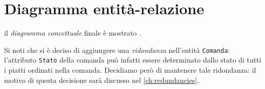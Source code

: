 \section{Diagramma entità-relazione}
il {\it diagramma concettuale} finale è mostrato .

Si noti che si è deciso di aggiungere una {\it ridondanza} nell'entità {\tt Comanda}:
l'attributo {\tt Stato} della comanda può infatti essere determinato dallo stato di
tutti i piatti ordinati nella comanda. Decidiamo però di mantenere tale ridondanza:
il motivo di questa decisione sarà discusso nel \vref{ch:redundancies}.
\clearpage
\begin{landscape}
\thispagestyle{empty}
\label{fig:conceptdiagram}
\end{landscape}
